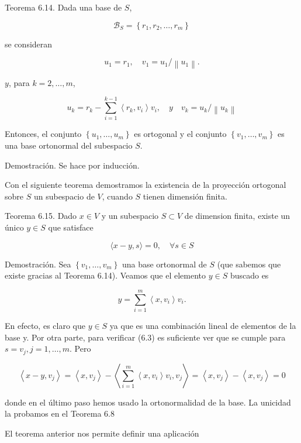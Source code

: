 \documentclass[10pt]{book}
\begin{document}
Teorema 6.14. Dada una base de $S$,

$$
\mathcal{B}_{S}=\left\{r_{1}, r_{2}, \ldots, r_{m}\right\}
$$

se consideran

$$
u_{1}=r_{1}, \quad v_{1}=u_{1} /\left\|u_{1}\right\| .
$$

$y$, para $k=2, \ldots, m$,

$$
u_{k}=r_{k}-\sum_{i=1}^{k-1}\left\langle r_{k}, v_{i}\right\rangle v_{i}, \quad y \quad v_{k}=u_{k} /\left\|u_{k}\right\|
$$

Entonces, el conjunto $\left\{u_{1}, \ldots, u_{m}\right\}$ es ortogonal y el conjunto $\left\{v_{1}, \ldots, v_{m}\right\}$ es una base ortonormal del subespacio $S$.

Demostración. Se hace por inducción.

Con el siguiente teorema demostramos la existencia de la proyección ortogonal sobre $S$ un subespacio de $V$, cuando $S$ tienen dimensión finita.

Teorema 6.15. Dado $x \in V$ y un subespacio $S \subset V$ de dimension finita, existe un único $y \in S$ que satisface


\begin{equation*}
\langle x-y, s\rangle=0, \quad \forall s \in S \tag{6.3}
\end{equation*}


Demostración. Sea $\left\{v_{1}, \ldots, v_{m}\right\}$ una base ortonormal de $S$ (que sabemos que existe gracias al Teorema 6.14). Veamos que el elemento $y \in S$ buscado es


\begin{equation*}
y=\sum_{i=1}^{m}\left\langle x, v_{i}\right\rangle v_{i} . \tag{6.4}
\end{equation*}


En efecto, es claro que $y \in S$ ya que es una combinación lineal de elementos de la base y. Por otra parte, para verificar (6.3) es suficiente ver que se cumple para $s=v_{j}, j=1, \ldots, m$. Pero

$$
\left\langle x-y, v_{j}\right\rangle=\left\langle x, v_{j}\right\rangle-\left\langle\sum_{i=1}^{m}\left\langle x, v_{i}\right\rangle v_{i}, v_{j}\right\rangle=\left\langle x, v_{j}\right\rangle-\left\langle x, v_{j}\right\rangle=0
$$

donde en el último paso hemos usado la ortonormalidad de la base. La unicidad la probamos en el Teorema 6.8

El teorema anterior nos permite definir una aplicación
\end{document}
